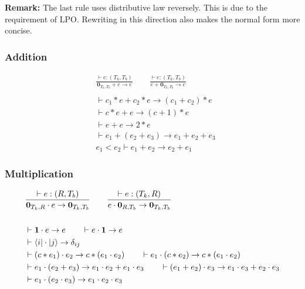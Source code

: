 \textbf{Remark:} The last rule uses distributive law reversely. This is due to the requirement of LPO. Rewriting in this direction also makes the normal form more concise.

\subsubsection*{Addition}
\begin{align*}
  & \frac{\vdash e : (T_k, T_b)}{\textbf{0}_{T_k, T_b} + e \to e}
  \qquad \frac{\vdash e : (T_k, T_b)}{e + \textbf{0}_{T_k, T_b}\to e}\\
  &\ \\
  & \vdash c_1 * e + c_2 * e \to (c_1 + c_2) * e \\
  & \vdash c * e + e \to (c + 1) * e \\
  & \vdash e + e \to 2 * e \\
  & \vdash e_1 + (e_2 + e_3) \to e_1 + e_2 + e_3 \\
  & e_1 < e_2 \vdash e_1 + e_2 \to e_2 + e_1
\end{align*}

\subsubsection*{Multiplication}
\begin{align*}
  & \frac{\vdash e : (R, T_b)}{\textbf{0}_{T_k, R} \cdot e \to \textbf{0}_{T_k, T_b}}
  \qquad \frac{\vdash e : (T_k, R)}{e \cdot \textbf{0}_{R, T_b}\to \textbf{0}_{T_k, T_b}}\\
  &\ \\
  & \vdash \mathbf{1} \cdot e \to e
  \qquad
  \vdash e \cdot \mathbf{1} \to e \\
  & \vdash \langle i| \cdot |j\rangle \to \delta_{ij}\\
  & \vdash (c * e_1) \cdot e_2 \to c * (e_1 \cdot e_2)
  \qquad \vdash e_1 \cdot (c * e_2) \to c * (e_1 \cdot e_2) \\ 
  & \vdash e_1 \cdot (e_2 + e_3) \to e_1 \cdot e_2 + e_1 \cdot e_3
  \qquad \vdash (e_1 + e_2) \cdot e_3 \to e_1 \cdot e_3 + e_2 \cdot e_3 \\
  & \vdash e_1 \cdot (e_2 \cdot e_3) \to e_1 \cdot e_2 \cdot e_3
\end{align*}

